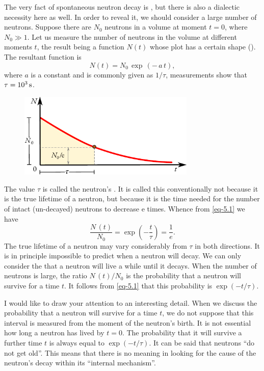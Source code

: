 The very fact of spontaneous neutron decay is , but there is
also a dialectic necessity here as well. In order to reveal it, we should
consider a large number of neutrons. Suppose there are $N_{0}$ neutrons in a volume at moment $t = 0$, where $N_{0} \gg 1$. Let us measure the number of neutrons in the volume at different moments $t$, the result being a function $N (t)$ whose plot has a certain shape (). The resultant
function is
\begin{equation}%
N(t) = N_{0} \, \exp \, ( - \,a \,t),
\label{eq-5.1}
\end{equation}
where $a$ is a constant and is commonly given as $1/\tau$, measurements
show that $\tau = \SI{d3}{\second}$.

\begin{figure}[!ht]
\centering
\includegraphics[width=0.75\textwidth]{figures/decay.pdf}
\end{figure}

The value $\tau$ is called the neutron's . It is called this
conventionally not because it is the true lifetime of a neutron, but
because it is the time needed for the number of intact (un-decayed)
neutrons to decrease e times. Whence from \eqref{eq-5.1} we have 
\begin{equation*}
\frac{N\,(t)}{N_{0}} = \exp \left( -\frac{t}{\tau} \right) = \frac{1}{e}.
\end{equation*}
The true lifetime of a neutron may vary considerably from
$\tau$ in both directions. It is in principle impossible to predict when
a neutron will decay. We can only consider the  that
a neutron will live a while until it decays. When the number of neutrons
is large, the ratio $N\, (t) / N_{0}$ is the probability that a neutron will survive for a time $t$. It follows from \eqref{eq-5.1} that this probability is $\exp (-t / \tau)$.

I would like to draw your attention to an interesting detail. When we
discuss the probability that a neutron will survive for a time $t$, we do
not suppose that this interval is measured from the moment of the
neutron's birth. It is not essential how long a neutron has lived by $t = 0$.
The probability that it will survive a further time $t$ is always equal to
$\exp  (-t / \tau)$. It can be said that neutrons ``do not get old''. This means that there is no meaning in looking for the cause of the neutron's decay
within its ``internal mechanism''.

